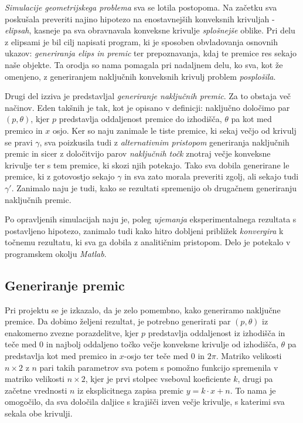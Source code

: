 \documentclass[a4paper]{article}
\begin{document}
\textit{Simulacije geometrijskega problema} sva se lotila postopoma. Na začetku sva poskušala preveriti najino hipotezo na enostavnejših konveksnih krivuljah - \textit{elipsah}, kasneje pa sva obravnavala konveksne krivulje \textit{splošnejše} oblike. Pri delu z elipsami je bil cilj napisati program, ki je sposoben obvladovanja osnovnih ukazov: \textit{generiranja elips in premic} ter prepoznavanja, kdaj te premice res sekajo naše objekte. Ta orodja so nama pomagala pri nadaljnem delu, ko sva, kot že omenjeno, z generiranjem naključnih konveksnih krivulj problem \textit{posplošila}.

Drugi del izziva je predstavljal \textit{generiranje naključnih premic}. Za to obstaja več načinov. Eden takšnih je tak, kot je opisano v definicji: naključno določimo par $(p,\theta)$, kjer $p$ predstavlja oddaljenost premice do izhodišča, $\theta$ pa kot med premico in $x$ osjo. Ker so naju zanimale le tiste premice, ki sekaj večjo od krivulj se pravi $\gamma$, sva poizkusila tudi z \textit{alternativnim pristopom} generiranja naključnih premic in sicer z določitvijo parov \textit{naključnih točk} znotraj večje konveksne krivulje ter s tem premice, ki skozi njih potekajo. Tako sva dobila generirane le premice, ki z gotovostjo sekajo $\gamma$ in sva zato morala preveriti zgolj, ali sekajo tudi $\gamma'$. Zanimalo naju je tudi, kako se rezultati spremenijo ob drugačnem generiranju naključnih premic.

Po opravljenih simulacijah naju je, poleg \textit{ujemanja} eksperimentalnega rezultata s postavljeno hipotezo, zanimalo tudi kako hitro dobljeni približek \textit{konvergira} k točnemu  rezultatu, ki sva ga dobila z analitičnim pristopom. Delo je potekalo v programskem okolju \textit{Matlab}.

\subsection{Generiranje premic}
Pri projektu se je izkazalo, da je zelo pomembno, kako generiramo naključne premice. Da dobimo željeni rezultat, je potrebno generirati par $(p, \theta)$ iz enakomerno zvezne porazdelitve, kjer $p$ predstavlja oddaljenost iz izhodišča in teče med $0$ in najbolj oddaljeno točko večje konveksne krivulje od izhodišča, $\theta$ pa predstavlja kot med premico in $x$-osjo ter teče med $0$ in $2\pi$. Matriko velikosti $n\times2$ z $n$ pari takih parametrov sva potem s pomožno funkcijo spremenila v matriko velikosti $n\times2$, kjer je prvi stolpec vseboval koeficiente $k$, drugi pa začetne vrednosti $n$ iz eksplicitnega zapisa premic $y=k\cdot x+n$. To nama je omogočilo, da sva določila daljice s krajišči izven večje krivulje, s katerimi sva sekala obe krivulji.
\end{document}
